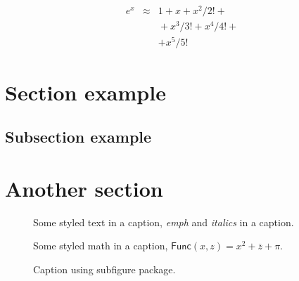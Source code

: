 \lipsum*[65]
\begin{eqnarray}
 e^x &\approx& 1+x+x^2/2! + \\
   && {}+x^3/3! + x^4/4! + \\
   && + x^5/5!
\end{eqnarray}

\section{Section example}
\lipsum[47]

\subsection{Subsection example}
\lipsum[56]

\section{Another section}
\lipsum[55-56]

\begin{figure}
\framebox[\textwidth]{\parbox{\textwidth}{\lipsum[65]}}
\caption{Some styled text in a caption, \emph{emph} and \textit{italics} in a caption.}
\end{figure}

\begin{figure}
\framebox[\textwidth]{\parbox{\textwidth}{\lipsum[65]}}
\caption{Some styled math in a caption, $\mathsf{Func}(x, z) = x^2 + \overline{z} + \pi$.}
\end{figure}

\begin{figure}
\centering
{}
\hfill
{}
\caption{Caption using subfigure package.}
\end{figure}